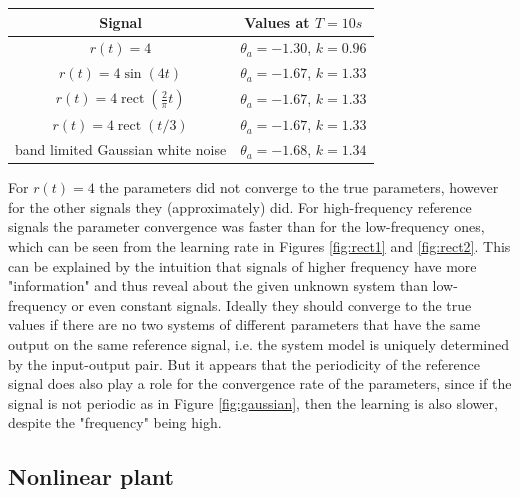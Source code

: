 \documentclass[12pt,a4paper]{article}
\begin{document}
	\begin{center}
		\begin{tabular}{c|c}
			Signal & Values at $T = 10s$ \\ \hline
			$r(t) = 4$ & $\theta_a = -1.30$, $k = 0.96$\\
			$r(t) = 4\sin(4t)$ & $\theta_a = -1.67$, $k = 1.33$\\
			$r(t) = 4\operatorname{rect}(\frac{2}{\pi}t)$ & $\theta_a = -1.67$, $k = 1.33$\\
			$r(t) = 4\operatorname{rect}(t/3)$ & $\theta_a = -1.67$, $k = 1.33$\\
			 band limited Gaussian white noise & $\theta_a = -1.68$, $k = 1.34$\\
		\end{tabular}
	\end{center}
	
	For $r(t) = 4$ the parameters did not converge to the true parameters, however for the other signals they (approximately) did. 
	For high-frequency reference signals the parameter convergence was faster than for the low-frequency ones, which can be seen from the learning rate in Figures
	\ref{fig:rect1} and \ref{fig:rect2}. 
	This can be explained by the intuition that signals of higher frequency have more "information" and thus reveal about the given unknown system than low-frequency or even constant signals.
	Ideally they should converge to  the true values if there are no two systems of different parameters that have the same output on the same reference signal, i.e. the system model is uniquely determined by the input-output pair.
	But it appears that the periodicity of the reference signal does also play a role for the convergence rate of the parameters, since if the signal is not periodic as in Figure \ref{fig:gaussian}, then the learning is also slower, despite the "frequency" being high.
	
	\subsection*{Nonlinear plant}
	
\end{document}
